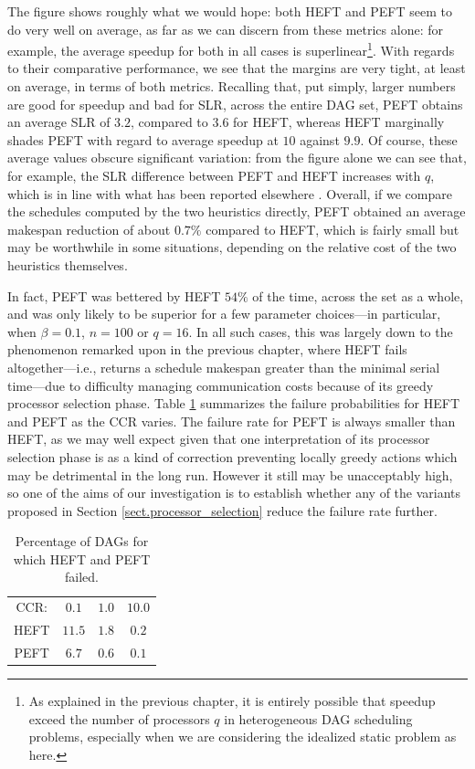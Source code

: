 \documentclass[12pt]{article}
\begin{document}
The figure shows roughly what we would hope: both HEFT and PEFT seem to do very well on average, as far as we can discern from these metrics alone: for example, the average speedup for both in all cases is superlinear\footnote{As explained in the previous chapter, it is entirely possible that speedup exceed the number of processors $q$ in heterogeneous DAG scheduling problems, especially when we are considering the idealized static problem as here.}. With regards to their comparative performance, we see that the margins are very tight, at least on average, in terms of both metrics. Recalling that, put simply, larger numbers are good for speedup and bad for SLR, across the entire DAG set, PEFT obtains an average SLR of $3.2$, compared to $3.6$ for HEFT, whereas HEFT marginally shades PEFT with regard to average speedup at $10$ against $9.9$. Of course, these average values obscure significant variation: from the figure alone we can see that, for example, the SLR difference between PEFT and HEFT increases with $q$, which is in line with what has been reported elsewhere \cite{arabnejad14}. Overall, if we compare the schedules computed by the two heuristics directly, PEFT obtained an average makespan reduction of about $0.7\%$ compared to HEFT, which is fairly small but may be worthwhile in some situations, depending on the relative cost of the two heuristics themselves.  

In fact, PEFT was bettered by HEFT $54\%$ of the time, across the set as a whole, and was only likely to be superior for a few parameter choices---in particular, when $\beta = 0.1$, $n = 100$ or $q = 16$. In all such cases, this was largely down to the phenomenon remarked upon in the previous chapter, where HEFT fails altogether---i.e., returns a schedule makespan greater than the minimal serial time---due to difficulty managing communication costs because of its greedy processor selection phase. Table \ref{tb.bench_failures} summarizes the failure probabilities for HEFT and PEFT as the CCR  varies. The failure rate for PEFT is always smaller than HEFT, as we may well expect given that one interpretation of its processor selection phase is as a kind of correction preventing locally greedy actions which may be detrimental in the long run. However it still may be unacceptably high, so one of the aims of our investigation is to establish whether any of the variants proposed in Section \ref{sect.processor_selection} reduce the failure rate further.  

\begin{table}
	\caption{Percentage of DAGs for which HEFT and PEFT failed.} 
	\begin{center}	
		\begin{tabular}{c c c c}
			\cmidrule{1-4}
			CCR: & $0.1$ & $1.0$ & $10.0$\\
			\cmidrule{1-4}
			HEFT & $11.5$ & $1.8$ & $0.2$\\
			PEFT & $6.7$ & $0.6$ & $0.1$\\
			\bottomrule
		\end{tabular}
		\label{tb.bench_failures}
	\end{center}	
\end{table}
\end{document}
